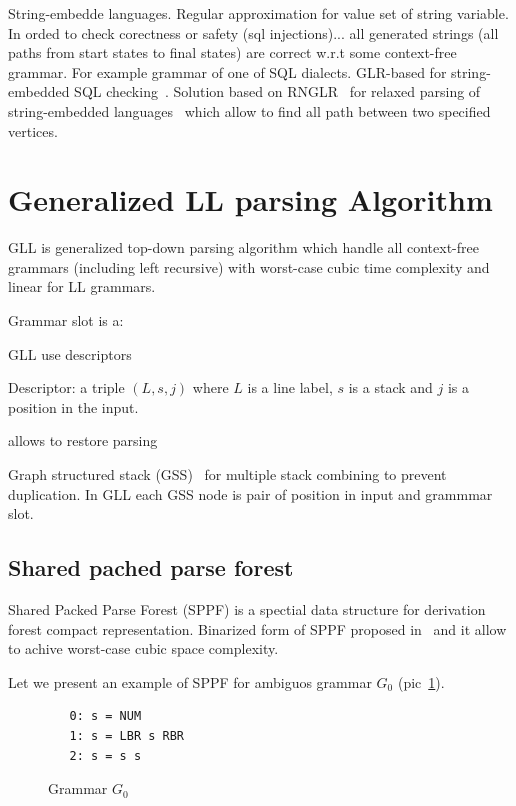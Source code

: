 \documentclass{sig-alternate} %
\begin{document}
String-embedde languages.
Regular approximation for value set of string variable.
In orded to check corectness or safety (sql injections)... all generated strings (all paths from start states to final states) are correct w.r.t some context-free grammar.
For example grammar of one of SQL dialects.
GLR-based for string-embedded SQL checking~\cite{Alvor1, Alvor2}.
Solution based on RNGLR~\cite{rnglr} for relaxed parsing of string-embedded languages~\cite{relaxedRNGLR} which allow to find all path between two specified vertices.

\section{Generalized LL parsing Algorithm}

GLL is generalized top-down parsing algorithm which handle all context-free grammars (including left recursive) with worst-case cubic time complexity and linear for LL grammars.

Grammar slot is a: 

GLL use descriptors

Descriptor: a triple $(L, s, j)$ where $L$ is a line label, $s$ is a stack and $j$ is a position in the input.

allows to restore parsing

Graph structured stack (GSS)~\cite{Tomita} for multiple stack combining to prevent duplication.
In GLL each GSS node is pair of position in input and grammmar slot.

\subsection{Shared pached parse forest}

Shared Packed Parse Forest (SPPF) is a spectial data structure for derivation forest compact representation. 
Binarized form of SPPF proposed in~\cite{brnglr} and it allow to achive worst-case cubic space complexity.

Let we present an example of SPPF for ambiguos grammar $G_0$ (pic~\ref{grammarG0}).

\begin{figure}[h]
   \begin{center}
\begin{verbatim}
   0: s = NUM
   1: s = LBR s RBR
   2: s = s s
\end{verbatim}
   \caption{Grammar $G_0$}
   \label{grammarG0}        
   \end{center}
\end{figure}
\end{document}
